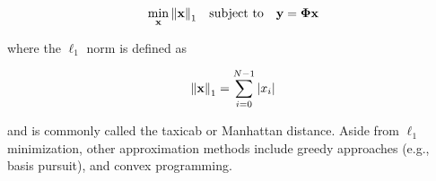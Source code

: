 \begin{equation}\label{eq:min-l1}
	\min_{\text{\bfseries x}} \norm{\text{\bfseries x}}_1 \quad \textrm{subject to} \quad \text{\bfseries y} = \bm\Phi \text{\bfseries x}
\end{equation}

\noindent where the $\ell_1$ norm is defined as

\begin{equation}\label{eq:l1-norm}
	\norm{\text{\bfseries x}}_1 = \sum_{i=0}^{N-1} \abs{x_i}
\end{equation}

\noindent and is commonly called the taxicab or Manhattan distance. Aside from $\ell_1$ minimization, other approximation methods include greedy approaches (e.g., basis pursuit), and convex programming.